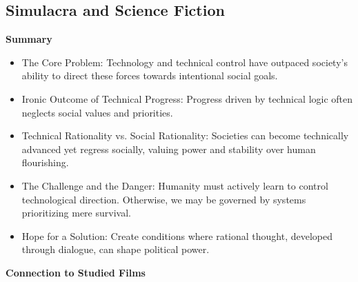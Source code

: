 \documentclass[11pt,fleqn]{book} %
\begin{document}
\subsection{Simulacra and Science Fiction}
\textbf{Summary}

\begin{itemize}
\item The Core Problem: Technology and technical control have outpaced society's ability to direct these forces towards intentional social goals.
\item Ironic Outcome of Technical Progress: Progress driven by technical logic often neglects social values and priorities.
\item Technical Rationality vs. Social Rationality:  Societies can become technically advanced yet regress socially, valuing power and stability over human flourishing.
\item The Challenge and the Danger: Humanity must actively learn to control technological direction. Otherwise, we may be governed by systems prioritizing mere survival.
\item Hope for a Solution: Create conditions where rational thought, developed through dialogue, can shape political power. 
\end{itemize}
\vspace{5pt}
\textbf{Connection to Studied Films}
\end{document}
